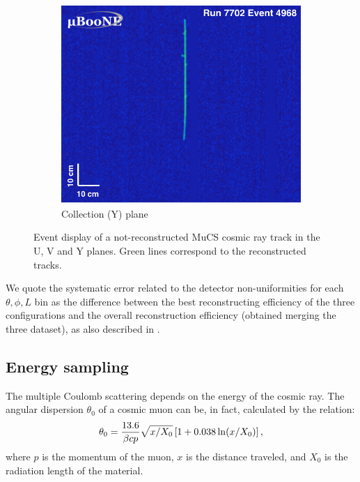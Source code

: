 \documentclass[a4paper]{scrartcl}
\begin{document}
\begin{figure}[htbp]
\begin{center}
    \begin{subfigure}{0.3\textwidth}
      \includegraphics[width=\linewidth]{figures/y.png}
      \caption{Collection (Y) plane} \label{fig:y}
    \end{subfigure}    \caption{Event display of a not-reconstructed MuCS cosmic ray track in the U, V and Y planes. Green lines correspond to the reconstructed tracks.} \label{fig:example}
  \end{center}
\end{figure}



We quote the systematic error related to the detector non-uniformities for each $\theta,\phi,L$ bin as the difference between the best reconstructing efficiency of the three configurations and the overall reconstruction efficiency (obtained merging the three dataset), as also described in \cite{besiii}.

\subsection{Energy sampling}
The multiple Coulomb scattering depends on the energy of the cosmic ray. The angular dispersion $\theta_{0}$ of a cosmic muon can be, in fact, calculated by the relation:
\begin{equation}
\theta_{0} = \frac{13.6}{\beta c p}\sqrt{x/X_{0}}\left[1+0.038\thinspace\mathrm{ln}(x/X_0)\right],
\end{equation}
where $p$ is the momentum of the muon, $x$ is the distance traveled, and $X_0$ is the radiation length of the material.
\end{document}
